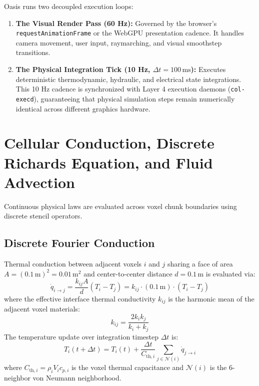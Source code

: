Oasis runs two decoupled execution loops:
\begin{enumerate}
    \item \textbf{The Visual Render Pass (60 Hz):} Governed by the browser's \texttt{requestAnimationFrame} or the WebGPU presentation cadence. It handles camera movement, user input, raymarching, and visual smoothstep transitions.
    \item \textbf{The Physical Integration Tick (10 Hz, $\Delta t = 100\,\mathrm{ms}$):} Executes deterministic thermodynamic, hydraulic, and electrical state integrations. This 10 Hz cadence is synchronized with Layer 4 execution daemons (\texttt{col-execd}), guaranteeing that physical simulation steps remain numerically identical across different graphics hardware.
\end{enumerate}

\section{Cellular Conduction, Discrete Richards Equation, and Fluid Advection}

Continuous physical laws are evaluated across voxel chunk boundaries using discrete stencil operators.

\subsection{Discrete Fourier Conduction}

Thermal conduction between adjacent voxels $i$ and $j$ sharing a face of area $A = (0.1\,\mathrm{m})^2 = 0.01\,\mathrm{m}^2$ and center-to-center distance $d = 0.1\,\mathrm{m}$ is evaluated via:
\begin{equation}
\dot{q}_{i \to j} = \frac{k_{ij} A}{d} (T_i - T_j) = k_{ij} \cdot (0.1\,\mathrm{m}) \cdot (T_i - T_j)
\label{eq:fourier_discrete}
\end{equation}
where the effective interface thermal conductivity $k_{ij}$ is the harmonic mean of the adjacent voxel materials:
\begin{equation}
k_{ij} = \frac{2 k_i k_j}{k_i + k_j}
\label{eq:harmonic_mean}
\end{equation}
The temperature update over integration timestep $\Delta t$ is:
\begin{equation}
T_i(t + \Delta t) = T_i(t) + \frac{\Delta t}{C_{\mathrm{th}, i}} \sum_{j \in \mathcal{N}(i)} \dot{q}_{j \to i}
\label{eq:temp_update}
\end{equation}
where $C_{\mathrm{th}, i} = \rho_i V_i c_{p,i}$ is the voxel thermal capacitance and $\mathcal{N}(i)$ is the 6-neighbor von Neumann neighborhood.

